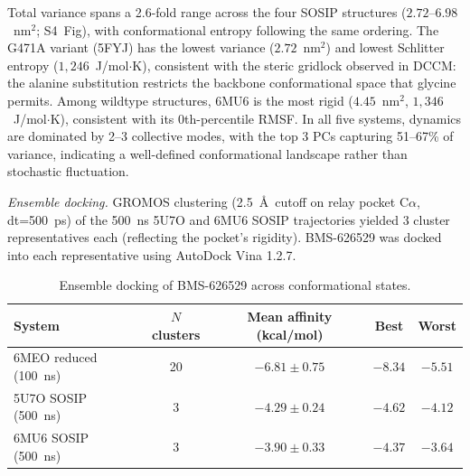 \documentclass[11pt,a4paper]{article}
\begin{document}
Total variance spans a 2.6-fold range across the four SOSIP structures ($2.72$--$6.98$~nm$^2$; S4~Fig), with conformational entropy following the same ordering. The G471A variant (5FYJ) has the lowest variance ($2.72$~nm$^2$) and lowest Schlitter entropy ($1{,}246$~J/mol$\cdot$K), consistent with the steric gridlock observed in DCCM: the alanine substitution restricts the backbone conformational space that glycine permits. Among wildtype structures, 6MU6 is the most rigid ($4.45$~nm$^2$, $1{,}346$~J/mol$\cdot$K), consistent with its 0th-percentile RMSF. In all five systems, dynamics are dominated by 2--3 collective modes, with the top 3 PCs capturing 51--67\% of variance, indicating a well-defined conformational landscape rather than stochastic fluctuation.

\textit{Ensemble docking.} GROMOS clustering (2.5~\AA\ cutoff on relay pocket C$\alpha$, dt=500~ps) of the 500~ns 5U7O and 6MU6 SOSIP trajectories yielded 3 cluster representatives each (reflecting the pocket's rigidity). BMS-626529 was docked into each representative using AutoDock Vina 1.2.7.

\begin{table}[h]
\centering
\caption{Ensemble docking of BMS-626529 across conformational states.}
\label{tab:sosip_ensemble}
\begin{tabular}{lcccc}
\hline
System & $N$ clusters & Mean affinity (kcal/mol) & Best & Worst \\
\hline
6MEO reduced (100~ns) & 20 & $-6.81 \pm 0.75$ & $-8.34$ & $-5.51$ \\
5U7O SOSIP (500~ns) & 3 & $-4.29 \pm 0.24$ & $-4.62$ & $-4.12$ \\
6MU6 SOSIP (500~ns) & 3 & $-3.90 \pm 0.33$ & $-4.37$ & $-3.64$ \\
\hline
\end{tabular}
\end{table}
\end{document}
